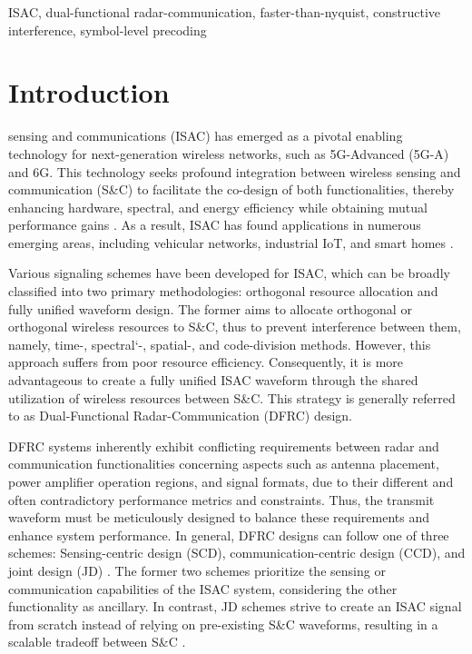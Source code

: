 \documentclass[lettersize,journal]{IEEEtran}
\newcommand{\nocolor}[1]{{\color{black}#1}}
\begin{document}
\begin{IEEEkeywords}
ISAC, dual-functional radar-communication, faster-than-nyquist, constructive interference, symbol-level precoding
\end{IEEEkeywords}

\section{Introduction}
 sensing and communications (ISAC) has emerged as a pivotal enabling technology for next-generation wireless networks, such as 5G-Advanced (5G-A) and 6G. This technology seeks profound integration between wireless sensing and communication (S\&C) to facilitate the co-design of both functionalities, thereby enhancing hardware, spectral, and energy efficiency while obtaining mutual performance gains \cite{pin2021integrated}. As a result, \nocolor{ISAC has found applications in numerous emerging areas, including vehicular networks, industrial IoT, and smart homes \cite{zheng2019radar}.} 

Various \nocolor{signaling} schemes have been developed for ISAC, which can be broadly classified into two primary methodologies: \nocolor{orthogonal} resource allocation and fully unified waveform design. The former aims to allocate \nocolor{orthogonal} or orthogonal wireless resources to S\&C, thus to prevent interference between them, {\nocolor{namely, time-, spectral`-, spatial-, and code-division methods}}. However, this approach suffers from poor resource efficiency. Consequently, it is more advantageous to create a fully unified ISAC waveform through the shared utilization of wireless resources between S\&C. This strategy is generally referred to as Dual-Functional Radar-Communication (DFRC) design.

DFRC systems inherently exhibit conflicting requirements between radar and communication functionalities concerning aspects such as antenna placement, power amplifier operation regions, and signal formats, \nocolor{due to their different \nocolor{and often} contradictory performance metrics and constraints}. Thus, the transmit waveform must be meticulously designed to balance these requirements and enhance system performance. \nocolor{In general,} DFRC designs can follow one of three schemes: Sensing-centric design (SCD), communication-centric design (CCD), and joint design (JD) \cite{liu2022integrated}. The former two schemes prioritize the sensing or communication capabilities of the ISAC system, considering the other functionality as ancillary. In contrast, JD schemes strive to create an ISAC signal from scratch instead of relying on pre-existing S\&C waveforms, resulting in a scalable tradeoff between S\&C \cite{feng2020china}.
\end{document}
